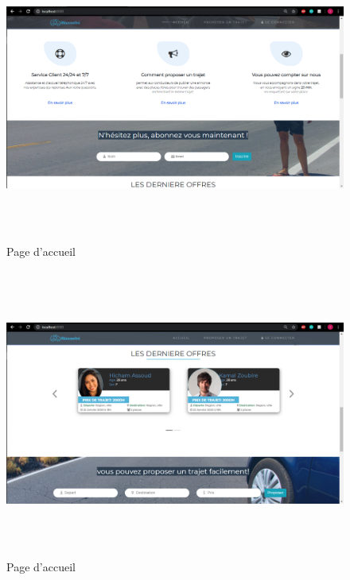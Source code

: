 \documentclass[a4paper]{report}
\begin{document}
\begin{spacing}{2}
\begin{figure}[!ht]
\begin{center}
\includegraphics[height=9.5cm]{accueil2.png}
\end{center}
\caption[Page d'accueil]{Page d'accueil}
\end{figure}
\begin{figure}[!ht]
\begin{center}
\includegraphics[height=9.5cm]{accueil3.png}
\end{center}
\caption[Page d'accueil]{Page d'accueil}
\end{figure}
\begin{figure}[!ht]
\begin{center}

\end{center}
\end{figure}
\end{spacing}
\end{document}
